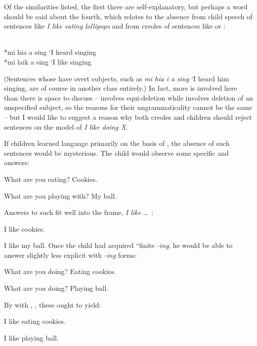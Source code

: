 Of the similarities listed, the first three are self-explanatory, but perhaps a word should be said about the fourth, which relates to the absence from child speech of sentences like \textit{I like eating lollipops} and from creoles of sentences like  or :

\ea\label{ex:3:41}
\langinfo{\langGC}{}{}\\
*mi hia a sing
\glt `I heard singing
\z
\ea\label{ex:3:42}
\langinfo{\langGC}{}{}\\
*mi laik a sing
\glt `I like singing
\z

\noindent (Sentences whose  have overt subjects, such as \textit{mi hia i a sing} `I heard him singing, are of course in another class entirely.) In fact, more is involved here than there is space to discuss --  involves equi-deletion while  involves deletion of an unspecified subject, so the reasons for their ungrammaticality cannot be the same -- but I would like to suggest a reason why both creoles and children should reject sentences on the model of \textit{I like doing X}.

If children learned language primarily on the basis of , the absence of such sentences would be mysterious. The child would observe some specific  and answers:

\ea\label{ex:3:43}
What are you eating? Cookies.
\z

\ea\label{ex:3:44}
 What are you playing with? My ball.
\z

\noindent Answers to such  fit well into the frame, \textit{I like} \ldots~:

\ea\label{ex:3:45}
 I like cookies.
\z

\ea\label{ex:3:46}
I like my ball.
\z
Once the child had acquired ``finite \textit{-ing}, he would be able to answer slightly less explicit  with \textit{-ing} forms:

\ea\label{ex:3:47}
 What are you doing? Eating cookies.
\z

\ea\label{ex:3:48}
 What are you doing? Playing ball.
\z

\noindent By  with , , these ought to yield:

\ea\label{ex:3:49}
 I like eating cookies. 
\z

\ea\label{ex:3:50}
 I like playing ball. 
\z

